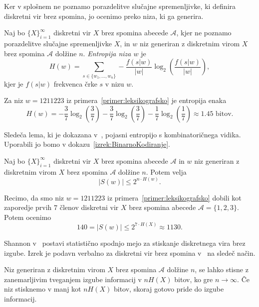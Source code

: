 \documentclass[fin1, tisk]{fmfdelo}
\providecommand{\abs}[1]{\left\lvert #1 \right\rvert}
\newcommand{\A}{\mathcal{A}}
\theoremstyle{definition}
\begin{document}
Ker v splošnem ne poznamo porazdelitve slučajne spremenljivke, ki definira diskretni vir brez
spomina, jo ocenimo preko niza, ki ga generira.

\begin{definicija}
    Naj bo $\{ X \}_{i=1}^{\infty}$ diskretni vir $X$ brez spomina abecede $\A$, kjer ne 
    poznamo porazdelitve slučajne spremenljivke $X$, in $w$ niz generiran z diskretnim virom $X$
    brez spomina $\A$ dolžine $n$.
    \emph{Entropija niza $w$} je
    \[
        H(w) = \sum_{s \in \{ w_1, \ldots, w_n \}} - \frac{f(s|w)}{\abs{w}} 
        \log_2 \left( \frac{f(s|w)}{\abs{w}} \right),
    \]
    kjer je $f(s|w)$ frekvenca črke $s$ v nizu $w$.
\end{definicija}

\begin{primer}\label{primer:EntropijaNiza}
    Za niz $w =1211223$ iz primera~\ref{primer:leksikografsko} je entropija enaka
    \[
        H(w) = 
        - \frac{3}{7} \log_2 \left( \frac{3}{7} \right)
        - \frac{3}{7} \log_2 \left( \frac{3}{7} \right)
        - \frac{1}{7} \log_2 \left( \frac{1}{7} \right)
        \approx 1.45 \text{ bitov}.
    \]
\end{primer}

Sledeča lema, ki je dokazana v~\cite[Lema 2.3]{CsiszarKorner2011}, pojasni entropijo s 
kombinatoričnega vidika. Uporabili jo bomo v dokazu~\ref{izrek:BinarnoKodiranje}.

\begin{lema}\label{lema:ocena}
    Naj bo $\{ X \}_{i=1}^{\infty}$ diskretni vir $X$ brez spomina abecede $\A$ in $w$ niz 
    generiran z diskretnim virom $X$ brez spomina $\A$ dolžine $n$. Potem velja 
    \[
        \abs{S(w)} \leq 2^{n \cdot H(w)}.
    \] 
\end{lema}

\begin{primer}
    Recimo, da smo niz $w=1211223$ iz primera~\ref{primer:leksikografsko} dobili kot 
    zaporedje prvih $7$ členov diskretni vir $X$ brez spomina abecede $\A = \{ 1,2,3 \}$. 
    Potem ocenimo
    \[
        140 = \abs{S(w)} \leq 2^{7 \cdot H(X)} \approx 1130.
    \]
\end{primer}

Shannon v~\cite{Shannon1949} postavi statistično spodnjo mejo za stiskanje diskretnega
vira brez izgube. Izrek je podavn verbalno za diskretni vir brez spomina 
v~\cite[1. poglavje, 4. razdelek]{Mackay2003} na sledeč način.

\begin{izrek}\label{izrek:EntropijaKodiranje}
    Niz generiran z diskretnim virom $X$ brez spomina $\A$ dolžine $n$, se lahko stisne z 
    zanemarljivim tveganjem izgube informacij v $n H(X)$ bitov, ko gre $n \to \infty$. 
    Če niz stisknemo v manj kot $n H(X)$ bitov, skoraj gotovo pride do izgube informacij.
\end{izrek}
\end{document}
